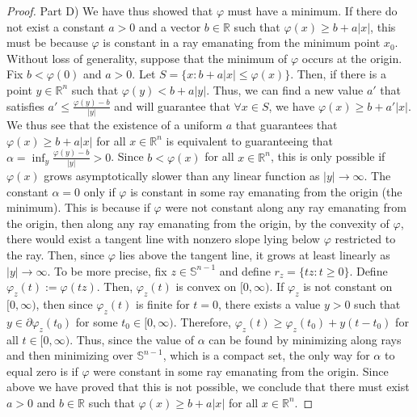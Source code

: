 \documentclass{amsart}
\theoremstyle{lemma}
\theoremstyle{remark}
\begin{document}
\begin{proof}
Part D) We have thus showed that $\varphi$ must have a minimum. If there do not exist a constant $a>0$ and a vector $b \in \mathbb{R}$ such that $\varphi(x) \geq b + a \vert x \vert$, this must be because $\varphi$ is constant in a ray emanating from the minimum point $x_0$. Without loss of generality, suppose that the minimum of $\varphi$ occurs at the origin. Fix $b  < \varphi(0)$ and $a>0$. Let $S = \{ x: b + a \vert x \vert \leq \varphi(x) \}$. Then, if there is a point $y \in \mathbb{R}^n$ such that $\varphi(y) < b + a \vert y \vert$. Thus, we can find a new value $a'$ that satisfies $a' \leq \frac{\varphi(y) - b}{\vert y \vert}$ and will guarantee that $\forall x \in S$, we have $\varphi(x) \geq b + a' \vert x \vert$. We thus see that the existence of a uniform $a$ that guarantees that $\varphi(x) \geq b + a \vert x \vert$ for all $x \in \mathbb{R}^n$ is equivalent to guaranteeing that $\alpha = \inf_{y} \frac{\varphi(y) - b}{\vert y \vert} > 0$. Since $b<\varphi(x)$ for all $x \in \mathbb{R}^n$, this is only possible if $\varphi(x)$ grows asymptotically slower than any linear function as $\vert y \vert \rightarrow \infty$. The constant $\alpha = 0$ only if $\varphi$ is constant in some ray emanating from the origin (the minimum). This is because if $\varphi$ were not constant along any ray emanating from the origin, then along any ray emanating from the origin, by the convexity of $\varphi$, there would exist a tangent line with nonzero slope lying below $\varphi$ restricted to the ray. Then, since $\varphi$ lies above the tangent line, it grows at least linearly as $\vert y \vert \rightarrow \infty$. To be more precise, fix $z \in \mathbb{S}^{n-1}$ and define $r_{z} = \{ t z : t \geq 0 \}$. Define $\varphi_{z}(t) := \varphi(t z)$. Then, $\varphi_{z}(t)$ is convex on $[0, \infty)$. If $\varphi_{z}$ is not constant on $[0, \infty)$, then since $\varphi_{z}(t)$ is finite for $t = 0$, there exists a value $y >0$ such that $y \in \partial \varphi_{z}(t_0)$ for some $t_0 \in [0, \infty)$. Therefore, $\varphi_{z}(t) \geq \varphi_{z}(t_0) + y(t - t_0)$ for all $t \in [0, \infty)$. Thus, since the value of $\alpha$ can be found by minimizing along rays and then minimizing over $\mathbb{S}^{n-1}$, which is a compact set, the only way for $\alpha$ to equal zero is if $\varphi$ were constant in some ray emanating from the origin. Since above we have proved that this is not possible, we conclude that there must exist $a>0$ and $b \in \mathbb{R}$ such that $\varphi(x) \geq b + a \vert x \vert$ for all $x \in \mathbb{R}^n$.


\end{proof}
\end{document}
